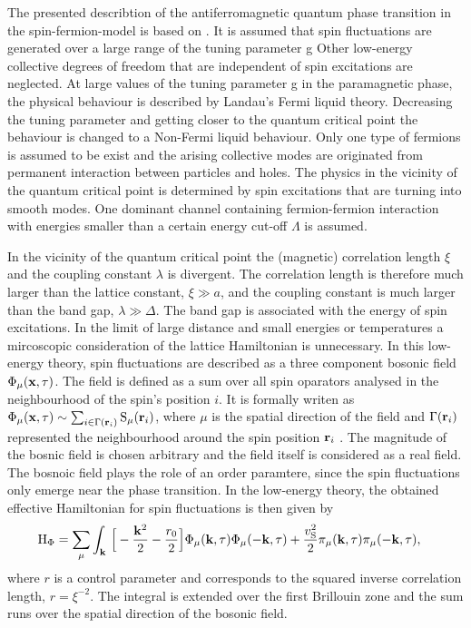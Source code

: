 The presented describtion of the antiferromagnetic quantum phase transition in the spin-fermion-model is based on \cite{Abanov&Chubukov&Schmalian}.
It is assumed that spin fluctuations are generated over a large range of the tuning parameter g 
Other low-energy collective degrees of freedom that are independent of spin excitations are neglected.
At large values of the tuning parameter g in the paramagnetic phase, the physical behaviour is described by Landau's Fermi liquid theory.
Decreasing the tuning parameter and getting closer to the quantum critical point the behaviour is changed to a Non-Fermi liquid behaviour.
Only one type of fermions is assumed to be exist and the arising collective modes are originated from permanent interaction between particles and holes.
The physics in the vicinity of the quantum critical point is determined by spin excitations that are turning into smooth modes.
One dominant channel containing fermion-fermion interaction with energies smaller than a certain energy cut-off $\Lambda$ is assumed.

In the vicinity of the quantum critical point the (magnetic) correlation length $\xi$ and the coupling constant $\lambda$ is divergent.
The correlation length is therefore much larger than the lattice constant, $\xi \gg a$, and the coupling constant is much larger than the band gap, $\lambda \gg \Delta$. 
The band gap is associated with the energy of spin excitations.
In the limit of large distance and small energies or temperatures a mircoscopic consideration of the lattice Hamiltonian is unnecessary.
In this low-energy theory, spin fluctuations are described as a three component bosonic field $\Phi_{\mu}(\vb{x}, \tau)$.
The field is defined as a sum over all spin oparators analysed in the neighbourhood of the spin's position $i$.
It is formally writen as $\Phi_{\mu}(\vb{x}, \tau) \sim \sum_{i \in \Gamma(\vb{r}_{i})} \mathrm{S}_{\mu}(\vb{r}_{i})$, where $\mu$ is the spatial direction of the field and $\Gamma(\vb{r}_{i})$ represented the neighbourhood around the spin position $\vb{r}_{i}$ \cite{SachdevQCP}.
The magnitude of the bosnic field is chosen arbitrary and the field itself is considered as a real field.
The bosnoic field plays the role of an order paramtere, since the spin fluctuations only emerge near the phase transition.
In the low-energy theory, the obtained effective Hamiltonian for spin fluctuations is then given by
%
\begin{align}
	\mathrm{H}_{\Phi} &= 
	 	\sum\limits_{\mu} \int_{\vb{k}}\, \Big[
	 	-\frac{\vb{k}^{2}}{2} - \frac{r_{0}}{2}\Big] \Phi_{\mu}(\vb{k},\tau) \Phi_{\mu}(-\vb{k},\tau)
		+
		\frac{v_{\mathrm{S}}^{2}}{2} \pi_{\mu}(\vb{k},\tau) \pi_{\mu}(-\vb{k},\tau),
	\label{eq:Hamiltonian spin fluctuation}
\end{align}
%
where $r$ is a control parameter and corresponds to the squared inverse correlation length, $r = \xi^{-2}$.
The integral is extended over the first Brillouin zone and the sum runs over the spatial direction of the bosonic field.

